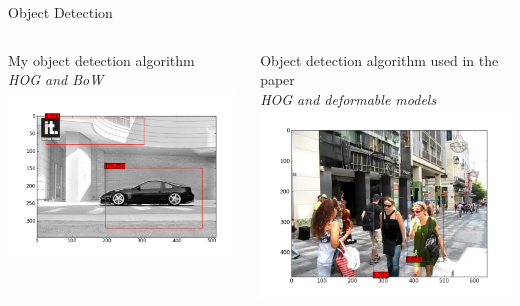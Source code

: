 \documentclass[final]{beamer}
\begin{document}
  \begin{frame}
    \begin{block}{\huge Object Detection}
      \LARGE
      \begin{columns}
        \begin{column}{.30\textwidth}
          \centering
          My object detection algorithm\\
          \emph{HOG and BoW}
          \vskip5mm
          \includegraphics[width=0.95\linewidth]{figures/detection-mine.png}
        \end{column}
        \begin{column}{.30\textwidth}
          \centering
          Object detection algorithm used in the paper\\
          \emph{HOG and deformable models}
          \vskip5mm
          \includegraphics[width=0.95\linewidth]{figures/detection-paper.png}

\end{column}
\end{columns}
\end{block}
\end{frame}
\end{document}
